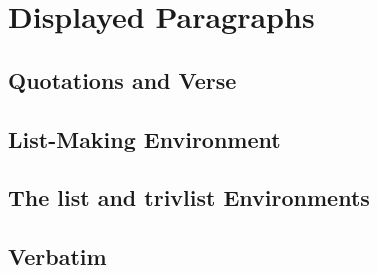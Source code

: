 \section{Displayed Paragraphs}
\subsection{Quotations and Verse}


\subsection{List-Making Environment}


\subsection{The list and trivlist Environments}


\subsection{Verbatim}
\newpage